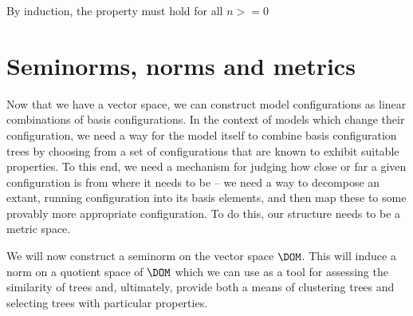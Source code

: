 \begin{remark}

 By induction, the property must hold for all \(n >= 0\)
\end{remark}

\section{Seminorms, norms and metrics} %

Now that we have a vector space, we can construct model configurations
as linear combinations of basis configurations. In the context of models
which change their configuration, we need a way for the model itself
to combine basis configuration trees by choosing from a set of
configurations that are known to exhibit suitable properties.  To this
end, we need a mechanism for judging how close or far a given
configuration is from where it needs to be -- we need a way to
decompose an extant, running configuration into its basis elements,
and then map these to some provably more appropriate configuration.
To do this, our structure needs to be a metric space.

We will now construct a seminorm on the vector space
$\DOM$. This will induce a norm on a quotient space of $\DOM$ which we
can use as a tool for assessing the similarity of trees and,
ultimately, provide both a means of clustering trees and selecting
trees with particular properties.


